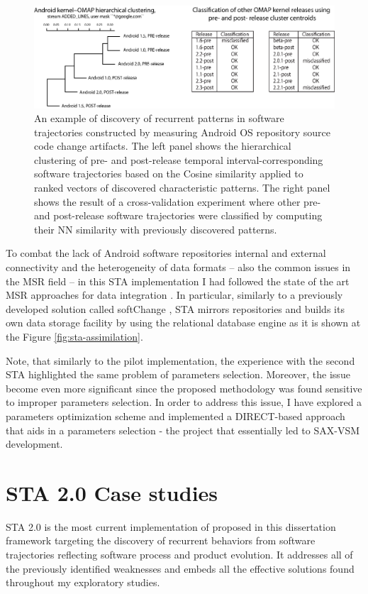 \begin{figure}[t]
   \centering
   \includegraphics[width=145mm]{figures/STA2.eps}
   \caption{An example of discovery of recurrent patterns in software trajectories constructed by measuring Android OS 
   repository source code change artifacts.
   The left panel shows the hierarchical clustering of pre- and post-release temporal interval-corresponding software 
   trajectories based on the Cosine similarity applied to ranked vectors of discovered characteristic patterns.
   The right panel shows the result of a cross-validation experiment where other pre- and post-release software trajectories 
   were classified by computing their NN similarity with previously discovered patterns.}
   \label{fig:STA2-results}
\end{figure}

To combat the lack of Android software repositories internal and external connectivity and the heterogeneity 
of data formats -- also the common issues in the MSR field -- in this STA implementation I had followed the state of 
the art MSR approaches for data integration \cite{citeulike:13058334} \cite{cvsanaly}. 
In particular, similarly to a previously developed solution called softChange \cite{german04_softchange}, STA mirrors 
repositories and builds its own data storage facility by using the relational database engine as it is shown at 
the Figure \ref{fig:sta-assimilation}.

Note, that similarly to the pilot implementation, the experience with the second STA highlighted the same problem of 
parameters selection. Moreover, the issue become even more significant since the proposed methodology was found sensitive to 
improper parameters selection. In order to address this issue, I have explored a parameters optimization scheme and 
implemented a DIRECT-based approach \cite{citeulike:12563460} that aids in a parameters selection - the project that 
essentially led to SAX-VSM development.

\section{STA 2.0 Case studies}
STA 2.0 is the most current implementation of proposed in this dissertation framework targeting the discovery of recurrent behaviors from software trajectories reflecting software process and product evolution. It addresses all of the previously identified weaknesses and embeds all the effective solutions found throughout my exploratory studies. 

